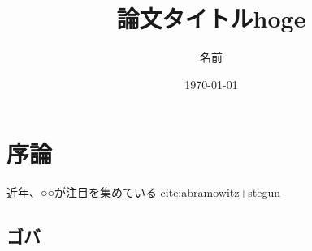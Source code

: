 \documentclass{jarticle}
\author{名前}
\date{\today}
\title{論文タイトルhoge}
\begin{document}
\maketitle


\section{序論}
\label{sec-1}
近年、○○が注目を集めている cite:abramowitz+stegun 
\subsection{ゴバ}
\label{sec-1-1}
\end{document}
